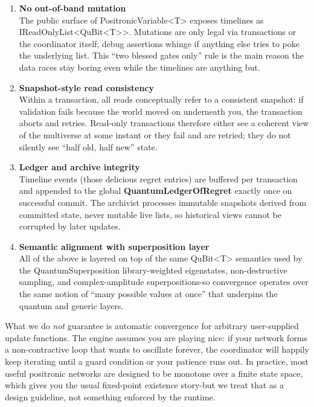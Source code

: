 \documentclass[a4paper,11pt]{article}
\begin{document}
\begin{enumerate}
\def\labelenumi{\arabic{enumi}.}
\setcounter{enumi}{2}
\item
  \textbf{No out-of-band mutation}\\
  The public surface of PositronicVariable\textless T\textgreater{} exposes timelines as IReadOnlyList\textless QuBit\textless T\textgreater\textgreater. Mutations are only legal via transactions or the coordinator itself; debug assertions whinge if anything else tries to poke the underlying list. This ``two blessed gates only'' rule is the main reason the data races stay boring even while the timelines are anything but.
\item
  \textbf{Snapshot-style read consistency}\\
  Within a transaction, all reads conceptually refer to a consistent snapshot: if validation fails because the world moved on underneath you, the transaction aborts and retries. Read-only transactions therefore either see a coherent view of the multiverse at some instant or they fail and are retried; they do not silently see ``half old, half new'' state.
\item
  \textbf{Ledger and archive integrity}\\
  Timeline events (those delicious regret entries) are buffered per transaction and appended to the global \textbf{QuantumLedgerOfRegret} exactly once on successful commit. The archivist processes immutable snapshots derived from committed state, never mutable live lists, so historical views cannot be corrupted by later updates.
\item
  \textbf{Semantic alignment with superposition layer}\\
  All of the above is layered on top of the same QuBit\textless T\textgreater{} semantics used by the QuantumSuperposition library-weighted eigenstates, non-destructive sampling, and complex-amplitude superpositions-so convergence operates over the same notion of ``many possible values at once'' that underpins the quantum and generic layers.
\end{enumerate}

What we do \emph{not} guarantee is automatic convergence for arbitrary user-supplied update functions. The engine assumes you are playing nice: if your network forms a non-contractive loop that wants to oscillate forever, the coordinator will happily keep iterating until a guard condition or your patience runs out. In practice, most useful positronic networks are designed to be monotone over a finite state space, which gives you the usual fixed-point existence story-but we treat that as a design guideline, not something enforced by the runtime.
\end{document}
